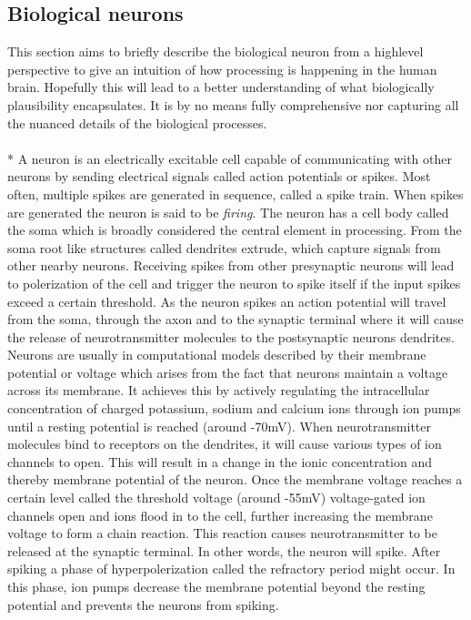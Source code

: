 \documentclass[a4paper,11pt]{article} %
\begin{document}
\subsection{Biological neurons} \label{sec:neurons}
This section aims to briefly describe the biological neuron from a highlevel perspective to give an intuition of how processing is happening in the human brain. Hopefully this will lead to a better understanding of what biologically plausibility encapsulates. It is by no means fully comprehensive nor capturing all the nuanced details of the biological processes. \\
\\*
A neuron is an electrically excitable cell capable of communicating with other neurons by sending electrical signals called action potentials or spikes. Most often, multiple spikes are generated in sequence, called a spike train. When spikes are generated the neuron is said to be \textit{firing}. The neuron has a cell body called the soma which is broadly considered the central element in processing. From the soma root like structures called dendrites extrude, which capture signals from other nearby neurons. Receiving spikes from other presynaptic neurons will lead to polerization of the cell and trigger the neuron to spike itself if the input spikes exceed a certain threshold. As the neuron spikes an action potential will travel from the soma, through the axon and to the synaptic terminal where it will cause the release of neurotransmitter molecules to the postsynaptic neurons dendrites. Neurons are usually in computational models described by their membrane potential or voltage which arises from the fact that neurons maintain a voltage across its membrane. It achieves this by actively regulating the intracellular concentration of charged potassium, sodium and calcium ions through ion pumps until a resting potential is reached (around -70mV). When neurotransmitter molecules bind to receptors on the dendrites, it will cause various types of ion channels to open. This will result in a change in the ionic concentration and thereby membrane potential of the neuron. Once the membrane voltage reaches a certain level called the threshold voltage (around -55mV) voltage-gated ion channels open and ions flood in to the cell, further increasing the membrane voltage to form a chain reaction. This reaction causes neurotransmitter to be released at the synaptic terminal. In other words, the neuron will spike. After spiking a phase of hyperpolerization called the refractory period might occur. In this phase, ion pumps decrease the membrane potential beyond the resting potential and prevents the neurons from spiking. \\
\end{document}

